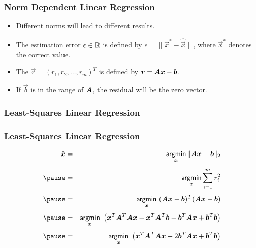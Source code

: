 \begin{frame}
  \frametitle{Norm Dependent Linear Regression \cont}

  \begin{itemize}
    \item Different norms will lead to different results. \\[.5cm]\pause 
    \item The estimation error $\epsilon\in \mathbb{R}$ is defined by $\epsilon= \|\vec x^*-\hat{\vec x}\|$, where $\vec x^*$ denotes the correct value. \\[.5cm] \pause 
    \item The  $\vec r= (r_1, r_2, \dots, r_m)^T$ is defined by ${\bm r}= {\bm A} {\bm x} -{\bm b}$. \\[.5cm] \pause
    \item If $\vec b$ is in the range of ${\bm A}$, the residual will be the zero vector.
  \end{itemize}
\end{frame}


\subsubsection{Least-Squares Linear Regression}

\begin{frame}
  \frametitle{Least-Squares Linear Regression}

 
  \begin{eqnarray*}
    \hat{\vec x} &=& \argmin_{\vec x} \| \mat A \vec x -\vec b\|_2 \\[.15cm] \pause 
                 &=& \argmin_{\vec x} \sum_{i=1}^m r_i^2 \\[.15cm] \pause 
                 &=& \argmin_{\vec x} \ (\mat A \vec x -\vec b)^T (\mat A \vec x -\vec b) \\[.15cm] \pause 
                 &=& \argmin_{\vec x} \ \big( \vec x^T \mat A^T \mat A\vec x - \vec x^T\mat A^T \vec b - \vec b^T \mat A\vec x + \vec b^T \vec b \big) \\[.15cm] \pause 
                 &=& \argmin_{\vec x} \ \big( \vec x^T \mat A^T \mat A\vec x - 2 \vec b^T \mat A\vec x + \vec b^T \vec b \big) \\
  \end{eqnarray*}
\end{frame}


